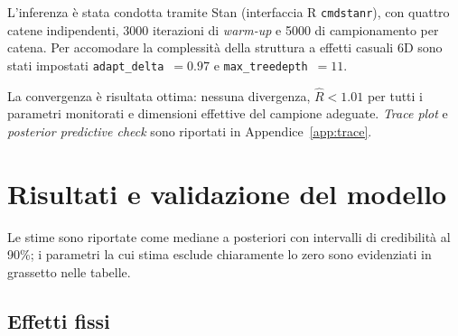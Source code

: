 \documentclass[11pt, a4paper]{article}
\begin{document}
L'inferenza è stata condotta tramite Stan (interfaccia R \texttt{cmdstanr}), con quattro catene indipendenti, 3000 iterazioni di \textit{warm-up} e 5000 di campionamento per catena. Per accomodare la complessità della struttura a effetti casuali 6D sono stati impostati \texttt{adapt\_delta}~$= 0.97$ e \texttt{max\_treedepth}~$= 11$.

La convergenza è risultata ottima: nessuna divergenza, $\hat{R} < 1.01$ per tutti i parametri monitorati e dimensioni effettive del campione adeguate. \textit{Trace plot} e \textit{posterior predictive check} sono riportati in Appendice~\ref{app:trace}.

\section{Risultati e validazione del modello}
\label{sec:risultati}

Le stime sono riportate come mediane a posteriori con intervalli di credibilità al 90\%; i parametri la cui stima esclude chiaramente lo zero sono evidenziati in grassetto nelle tabelle.

\subsection{Effetti fissi}
\label{subsec:fixed}
\end{document}
